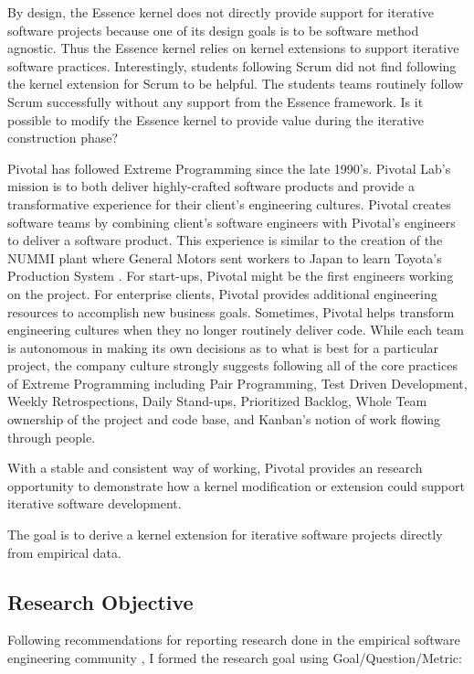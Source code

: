 \documentclass[preprint,12pt,3p]{elsarticle}
\begin{document}
By design, the Essence kernel does not directly provide support for iterative software projects because one of its design goals is to be software method agnostic.\cite{ICSE2014} Thus the Essence kernel relies on kernel extensions to support iterative software practices. Interestingly, students following Scrum did not find following the kernel extension for Scrum to be helpful. The students teams routinely follow Scrum successfully without any support from the Essence framework. Is it possible to modify the Essence kernel to provide value during the iterative construction phase? 

Pivotal has followed Extreme Programming \cite{ExtremeProgrammingExplained} since the late 1990's. Pivotal Lab's mission is to both deliver highly-crafted software products and provide a transformative experience for their client's engineering cultures. Pivotal creates software teams by combining client's software engineers with Pivotal's engineers to deliver a software product. This experience is similar to the creation of the NUMMI plant where General Motors sent workers to Japan to learn Toyota's Production System \cite{Nummi}. For start-ups, Pivotal might be the first engineers working on the project. For enterprise clients, Pivotal provides additional engineering resources to accomplish new business goals. Sometimes, Pivotal helps transform engineering cultures when they no longer routinely deliver code.  While each team is autonomous in making its own decisions as to what is best for a particular project, the company culture strongly suggests following all of the core practices of Extreme Programming including Pair Programming, Test Driven Development, Weekly Retrospections, Daily Stand-ups, Prioritized Backlog, Whole Team ownership of the project and code base, and Kanban's notion of work flowing through people. 

With a stable and consistent way of working, Pivotal provides an research opportunity to demonstrate how a kernel modification or extension could support iterative software development. 

The goal is to derive a kernel extension for iterative software projects directly from empirical data. 

\subsection{Research Objective}
Following recommendations for reporting research done in the empirical
software engineering community
\cite{GQM, Shaw}, I formed the
research goal using Goal/Question/Metric:
\cite{GQM}
\end{document}
